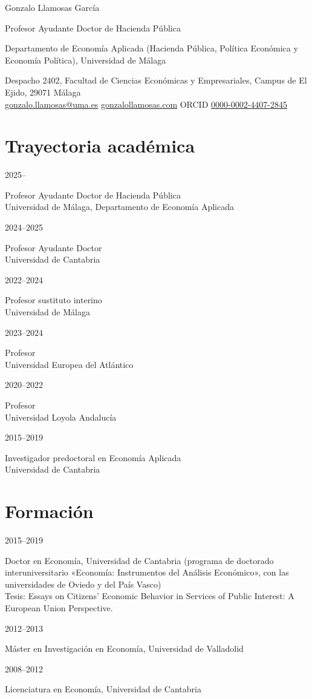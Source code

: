 \documentclass[11pt,a4paper]{article}
\newcommand{\entry}[2]{\begin{minipage}[t]{2.6cm}\sffamily\small\textcolor{muted}{#1}\end{minipage}%
  \begin{minipage}[t]{\linewidth-2.6cm}\raggedright #2\end{minipage}\par\vspace{4pt}}
\begin{document}
{\slab\color{accent}\fontsize{26}{30}\selectfont Gonzalo Llamosas García}\par\vspace{6pt}
{\sffamily\large Profesor Ayudante Doctor de Hacienda Pública}\par\vspace{2pt}
{\sffamily Departamento de Economía Aplicada (Hacienda Pública, Política Económica y Economía Política), Universidad de Málaga}\par\vspace{6pt}
{\sffamily\small\color{muted}Despacho 2402, Facultad de Ciencias Económicas y Empresariales, Campus de El Ejido, 29071 Málaga\\
\href{mailto:gonzalo.llamosas@uma.es}{gonzalo.llamosas@uma.es} \quad \href{https://gonzalollamosas.com}{gonzalollamosas.com} \quad ORCID \href{https://orcid.org/0000-0002-4407-2845}{0000-0002-4407-2845}}\par
\vspace{4pt}{\sffamily\small Acreditado por ANECA como Profesor Contratado Doctor}\par
\section{Trayectoria académica}
\entry{2025–}{Profesor Ayudante Doctor de Hacienda Pública\\{\small\color{muted}Universidad de Málaga, Departamento de Economía Aplicada}}
\entry{2024–2025}{Profesor Ayudante Doctor\\{\small\color{muted}Universidad de Cantabria}}
\entry{2022–2024}{Profesor sustituto interino\\{\small\color{muted}Universidad de Málaga}}
\entry{2023–2024}{Profesor\\{\small\color{muted}Universidad Europea del Atlántico}}
\entry{2020–2022}{Profesor\\{\small\color{muted}Universidad Loyola Andalucía}}
\entry{2015–2019}{Investigador predoctoral en Economía Aplicada\\{\small\color{muted}Universidad de Cantabria}}

\section{Formación}
\entry{2015–2019}{Doctor en Economía, Universidad de Cantabria (programa de doctorado interuniversitario «Economía: Instrumentos del Análisis Económico», con las universidades de Oviedo y del País Vasco)\\{\small\color{muted}Tesis: Essays on Citizens’ Economic Behavior in Services of Public Interest: A European Union Perspective.}}
\entry{2012–2013}{Máster en Investigación en Economía, Universidad de Valladolid}
\entry{2008–2012}{Licenciatura en Economía, Universidad de Cantabria}
\end{document}
